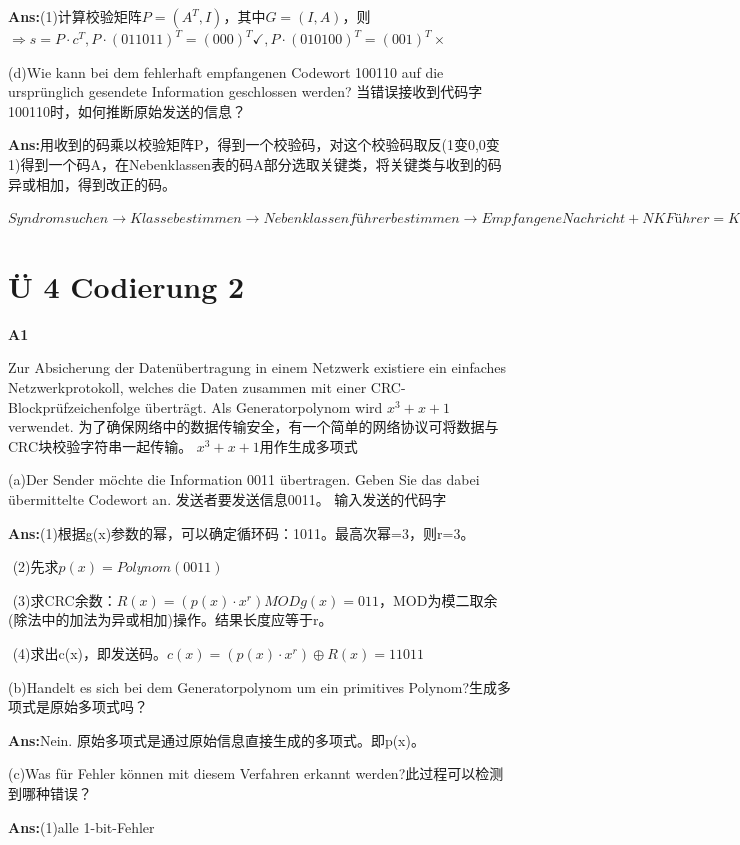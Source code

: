 \documentclass[fleqn]{article}
\begin{document}
\textbf{Ans:}(1)计算校验矩阵$P=(A^T,I)$，其中$G=(I,A)$，则$\Rightarrow s=P\cdot c^T,P\cdot(011011)^T =(000)^T\checkmark,P\cdot(010100)^T=(001)^T\times$

(d)Wie kann bei dem fehlerhaft empfangenen Codewort 100110 auf die ursprünglich gesendete Information geschlossen werden?
当错误接收到代码字100110时，如何推断原始发送的信息？

\textbf{Ans:}用收到的码乘以校验矩阵P，得到一个校验码，对这个校验码取反(1变0,0变1)得到一个码A，在Nebenklassen表的码A部分选取关键类，将关键类与收到的码异或相加，得到改正的码。

$Syndrom suchen \rightarrow Klasse bestimmen \rightarrow Nebenklassenführer bestimmen \rightarrow Empfangene Nachricht + NK Führer = Korrigiertes Codewort$ 

\section{Ü 4 Codierung 2}

\noindent\textbf{A1}

Zur Absicherung der Datenübertragung in einem Netzwerk existiere ein einfaches Netzwerkprotokoll, welches die Daten zusammen mit einer CRC-Blockprüfzeichenfolge überträgt. Als Generatorpolynom wird $x^3+x+1$ verwendet.
为了确保网络中的数据传输安全，有一个简单的网络协议可将数据与CRC块校验字符串一起传输。 $ x ^ 3 + x + 1 $用作生成多项式

(a)Der Sender möchte die Information 0011 übertragen. Geben Sie das dabei übermittelte Codewort an. 
发送者要发送信息0011。 输入发送的代码字

\textbf{Ans:}(1)根据g(x)参数的幂，可以确定循环码：1011。最高次幂=3，则r=3。

\quad \quad \,\,(2)先求$p(x)=Polynom(0011)$

\quad \quad \,\,(3)求CRC余数：$R(x)=(p(x)\cdot x^r) MOD g(x) = 011$，MOD为模二取余(除法中的加法为异或相加)操作。结果长度应等于r。

\quad \quad \,\,(4)求出c(x)，即发送码。$c(x)=(p(x)\cdot x^r)\oplus R(x)=11011$

(b)Handelt es sich bei dem Generatorpolynom um ein primitives Polynom?生成多项式是原始多项式吗？

\textbf{Ans:}Nein. 原始多项式是通过原始信息直接生成的多项式。即p(x)。

(c)Was für Fehler können mit diesem Verfahren erkannt werden?此过程可以检测到哪种错误？

\textbf{Ans:}(1)alle 1-bit-Fehler 
\end{document}
